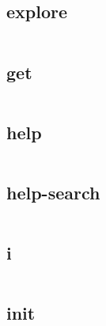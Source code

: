 \subsection{explore}



\begin{lstlisting}[language=bash]

\end{lstlisting}

\subsection{get}



\begin{lstlisting}[language=bash]

\end{lstlisting}

\subsection{help}



\begin{lstlisting}[language=bash]

\end{lstlisting}

\subsection{help-search}

\begin{lstlisting}[language=bash]

\end{lstlisting}

\subsection{i}


\begin{lstlisting}[language=bash]

\end{lstlisting}

\subsection{init}


\begin{lstlisting}[language=bash]

\end{lstlisting}

